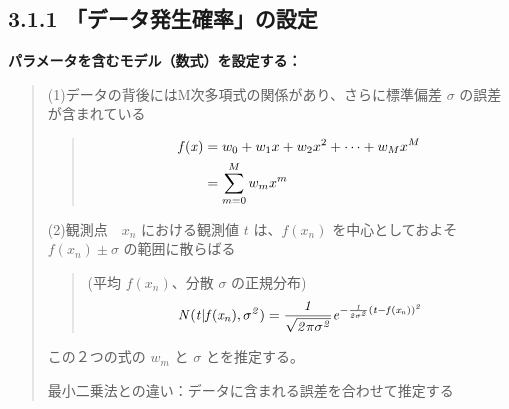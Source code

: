 \documentclass[letterpaper,10pt,dvipdfmx]{sphinxmanual}
\begin{document}
\subsection{3.1.1 「データ発生確率」の設定}
\label{Chapter_3_MLE:id2}
\textbf{パラメータを含むモデル（数式）を設定する：}
\begin{quote}

(1)データの背後にはM次多項式の関係があり、さらに標準偏差 \(\sigma\) の誤差が含まれている
\begin{quote}
\begin{equation*}
\begin{split}\it{f}(x) &= w_0 + w_1 x + w_2 x^2 + \cdots + w_M x^M \\
      &= \sum_{m=0}^M w_m x^m\end{split}
\end{equation*}\end{quote}

(2)観測点　\(x_n\) における観測値 \(t\) は、\(f(x_n)\) を中心としておよそ \(f(x_n) \pm \sigma\) の範囲に散らばる
\begin{quote}

(平均 \(f(x_n)\)、分散 \(\sigma\) の正規分布)
\begin{equation*}
\begin{split}\it{N} ( t | f(x_n), \sigma^2 ) = \frac{1}{\sqrt{2 \pi \sigma^2}} e^{- \frac{1}{2 \sigma^2}(t - f(x_n))^2}\end{split}
\end{equation*}\end{quote}

この２つの式の \(w_m\) と \(\sigma\) とを推定する。

最小二乗法との違い：データに含まれる誤差を合わせて推定する

\noindent{}
\end{quote}
\end{document}
